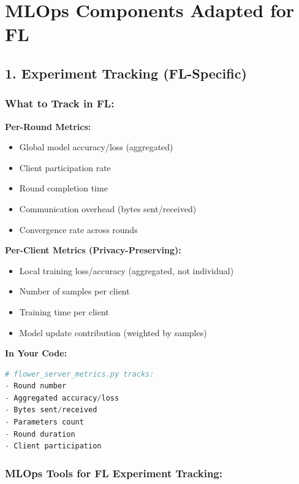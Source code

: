 \documentclass[12pt]{article}
\begin{document}
\section{MLOps Components Adapted for FL}

\subsection{1. Experiment Tracking (FL-Specific)}

\subsubsection{What to Track in FL:}

\textbf{Per-Round Metrics:}
\begin{itemize}
    \item Global model accuracy/loss (aggregated)
    \item Client participation rate
    \item Round completion time
    \item Communication overhead (bytes sent/received)
    \item Convergence rate across rounds
\end{itemize}

\textbf{Per-Client Metrics (Privacy-Preserving):}
\begin{itemize}
    \item Local training loss/accuracy (aggregated, not individual)
    \item Number of samples per client
    \item Training time per client
    \item Model update contribution (weighted by samples)
\end{itemize}

\textbf{In Your Code:}
\begin{lstlisting}[language=Python]
# flower_server_metrics.py tracks:
- Round number
- Aggregated accuracy/loss
- Bytes sent/received
- Parameters count
- Round duration
- Client participation
\end{lstlisting}

\subsubsection{MLOps Tools for FL Experiment Tracking:}
\end{document}
